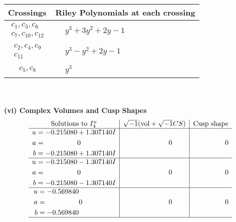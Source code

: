 \documentclass[1p]{elsarticle_modified}
\theoremstyle{definition}
\newcommand{\I}{\sqrt{-1}}
\begin{document}
\begin{tabular}{m{50pt}|m{274pt}}
Crossings & \hspace{64pt}Riley Polynomials at each crossing \\
\hline $$\begin{aligned}c_{1},c_{3},c_{6}\\c_{7},c_{10},c_{12}\end{aligned}$$&$\begin{aligned}
&y^3+3 y^2+2 y-1
\end{aligned}$\\
\hline $$\begin{aligned}c_{2},c_{4},c_{9}\\c_{11}\end{aligned}$$&$\begin{aligned}
&y^3- y^2+2 y-1
\end{aligned}$\\
\hline $$\begin{aligned}c_{5},c_{8}\end{aligned}$$&$\begin{aligned}
&y^3
\end{aligned}$\\
\hline
\end{tabular}\\~\\
\newpage\flushleft \textbf{(vi) Complex Volumes and Cusp Shapes}
$$\begin{array}{c|c|c}  
\text{Solutions to }I^u_{4}& \I (\text{vol} + \sqrt{-1}CS) & \text{Cusp shape}\\
 \hline 
\begin{aligned}
u &= -0.215080 + 1.307140 I \\
a &= \phantom{-0.000000 } 0 \\
b &= -0.215080 + 1.307140 I\end{aligned}
 & \phantom{-0.000000 } 0 & \phantom{-0.000000 } 0 \\ \hline\begin{aligned}
u &= -0.215080 - 1.307140 I \\
a &= \phantom{-0.000000 } 0 \\
b &= -0.215080 - 1.307140 I\end{aligned}
 & \phantom{-0.000000 } 0 & \phantom{-0.000000 } 0 \\ \hline\begin{aligned}
u &= -0.569840\phantom{ +0.000000I} \\
a &= \phantom{-0.000000 } 0 \\
b &= -0.569840\phantom{ +0.000000I}\end{aligned}
 & \phantom{-0.000000 } 0 & \phantom{-0.000000 } 0\\
 \hline 
 \end{array}$$\newpage\newpage\renewcommand{\arraystretch}{1}
\end{document}
